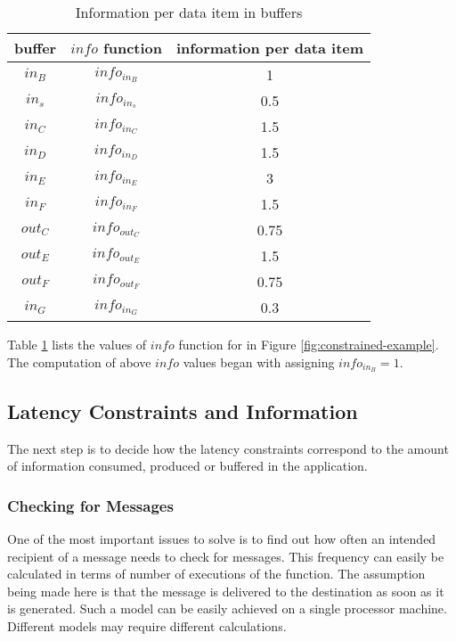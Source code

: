 
\begin{table}
\centering
\begin{tabular}{|c|c|c|}
\hline buffer & $info$ function & information per data item \\
\hline ${in_B}$ & $info_{in_B}$ & 1 \\
\hline ${in_s}$ & $info_{in_s}$ & 0.5 \\
\hline ${in_C}$ & $info_{in_C}$ & 1.5 \\
\hline ${in_D}$ & $info_{in_D}$ & 1.5 \\
\hline ${in_E}$ & $info_{in_E}$ & 3 \\
\hline ${in_F}$ & $info_{in_F}$ & 1.5 \\
\hline ${out_C}$ & $info_{out_C}$ & 0.75 \\
\hline ${out_E}$ & $info_{out_E}$ & 1.5 \\
\hline ${out_F}$ & $info_{out_F}$ & 0.75 \\
\hline ${in_G}$ & $info_{in_G}$ & 0.3 \\
\hline
\end{tabular}
\caption{Information per data item in
buffers}\label{tbl:constrained-info-buffer}
\end{table}

Table \ref{tbl:constrained-info-buffer} lists the values of $info$
function for {{\Channels}} in Figure \ref{fig:constrained-example}.
The computation of above $info$ values began with assigning
$info_{in_B} = 1$.

\subsection{Latency Constraints and Information}
\label{sec:constrained:constraints}

The next step is to decide how the latency constraints correspond
to the amount of information consumed, produced or buffered in the
application.

\subsubsection{Checking for Messages}

One of the most important issues to solve is to find out how often
an intended recipient of a message needs to check for messages.
This frequency can easily be calculated in terms of number of
executions of the {\work} function.  The assumption being made here
is that the message is delivered to the destination as soon as it
is generated.  Such a model can be easily achieved on a single
processor machine.  Different models may require different
calculations.

